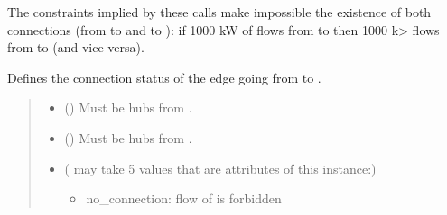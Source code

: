 \documentclass[letterpaper,10pt,english]{sphinxmanual}
\begin{document}
\begin{fulllineitems}
\begin{fulllineitems}
\sphinxAtStartPar
The constraints implied by these calls make impossible the existence of both connections
(from  to  and  to ): if 1000 kW of  flows from  to 
then \sphinxhyphen{}1000 k\textgreater{} flows from  to  (and vice versa).

\end{fulllineitems}


\begin{fulllineitems}
\label{\detokenize{generated/tamos.network.NonThermalNetwork:tamos.network.NonThermalNetwork.set_connection_status}}
\pysigstartsignatures
{}
\pysigstopsignatures
\sphinxAtStartPar
Defines the connection status of the edge going from  to .
\begin{quote}\begin{description}
\begin{itemize}
\item {} 
\sphinxAtStartPar
{} ({\hyperref[\detokenize{generated/tamos.Hub:tamos.Hub}]{}}) \textendash{} Must be hubs from .

\item {} 
\sphinxAtStartPar
{} ({\hyperref[\detokenize{generated/tamos.Hub:tamos.Hub}]{}}) \textendash{} Must be hubs from .

\item {} 
\sphinxAtStartPar
{} ( may take 5 values that are attributes of this instance:) \textendash{} \begin{itemize}
\item {} 
\sphinxAtStartPar
no\_connection: flow of  is forbidden


\end{itemize}
\end{itemize}
\end{description}
\end{quote}
\end{fulllineitems}
\end{fulllineitems}
\end{document}

